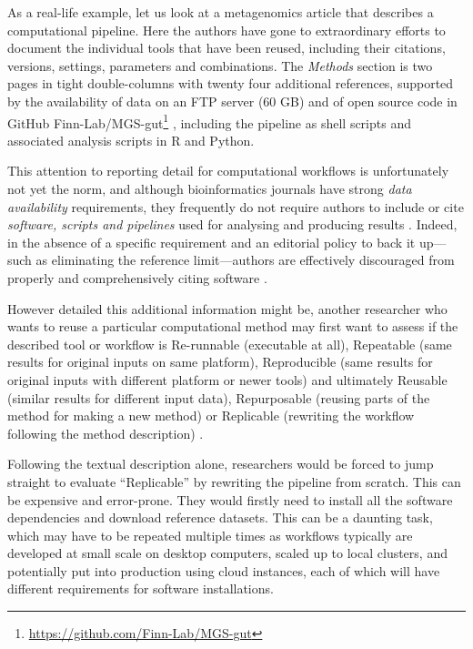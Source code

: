 As a real-life example, let us look at a metagenomics article
\cite{Almeida 2019} that describes
a computational pipeline. Here the authors have gone to extraordinary
efforts to document the individual tools that have been reused,
including their citations, versions, settings, parameters and
combinations. The \emph{Methods} section is two pages in tight
double-columns with twenty four additional references, supported by the
availability of data on an FTP server (60 GB)
\cite{EMBL-EBI 2019}
and of open source code in GitHub
Finn-Lab/MGS-gut\footnote{\url{https://github.com/Finn-Lab/MGS-gut}}
\cite{EMBL-EBI 2020}, including the
pipeline as shell scripts and associated analysis scripts in R and
Python.

This attention to reporting detail for computational workflows is
unfortunately not yet the norm, and although bioinformatics journals
have strong \emph{data availability} requirements, they frequently do
not require authors to include or cite \emph{software, scripts and
pipelines} used for analysing and producing results \cite{Soiland-Reyes 2020a}.
Indeed, in the absence of a specific requirement and an editorial policy
to back it up---such as eliminating the reference limit---authors are
effectively discouraged from properly and comprehensively citing
software \cite{Nature 2019}.

However detailed this additional information might be, another
researcher who wants to reuse a particular computational method may
first want to assess if the described tool or workflow is Re-runnable
(executable at all), Repeatable (same results for original inputs on
same platform), Reproducible (same results for original inputs with
different platform or newer tools) and ultimately Reusable (similar
results for different input data), Repurposable (reusing parts of the
method for making a new method) or Replicable (rewriting the workflow
following the method description)
\cite{Benureau 2017,Goble 2016}.

Following the textual description alone, researchers would be forced to
jump straight to evaluate ``Replicable'' by rewriting the pipeline from
scratch. This can be expensive and error-prone. They would firstly need
to install all the software dependencies and download reference
datasets. This can be a daunting task, which may have to be repeated
multiple times as workflows typically are developed at small scale on
desktop computers, scaled up to local clusters, and potentially put into
production using cloud instances, each of which will have different
requirements for software installations.

